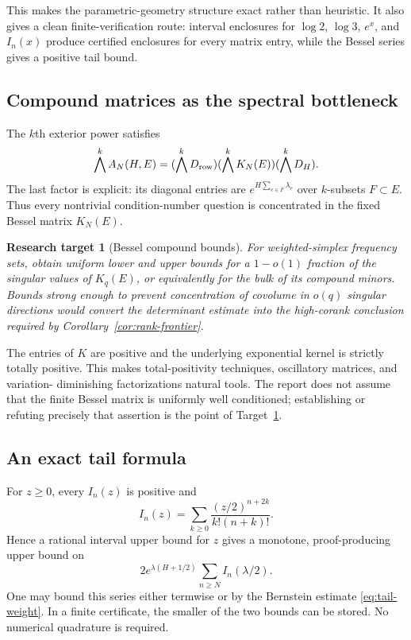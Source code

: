 \documentclass[11pt,oneside]{article}
\newtheorem{target}[theorem]{Research target}
\theoremstyle{definition}
\theoremstyle{remark}
\begin{document}
This makes the parametric-geometry structure exact rather than heuristic.  It also gives a
clean finite-verification route: interval enclosures for $\log2$, $\log3$, $e^x$, and
$I_n(x)$ produce certified enclosures for every matrix entry, while the Bessel series gives a
positive tail bound.

\subsection{Compound matrices as the spectral bottleneck}

The $k$th exterior power satisfies
\[
 \bigwedge^k A_N(H,E)=
 (\bigwedge^kD_{\rm row})(\bigwedge^kK_N(E))(\bigwedge^kD_H).
\]
The last factor is explicit: its diagonal entries are
$e^{H\sum_{e\in F}\lambda_e}$ over $k$-subsets $F\subset E$.  Thus every nontrivial
condition-number question is concentrated in the fixed Bessel matrix $K_N(E)$.

\begin{target}[Bessel compound bounds]
\label{target:bessel-compounds}
For weighted-simplex frequency sets, obtain uniform lower and upper bounds for a
$1-o(1)$ fraction of the singular values of $K_q(E)$, or equivalently for the bulk of its
compound minors.  Bounds strong enough to prevent concentration of covolume in $o(q)$ singular
directions would convert the determinant estimate into the high-corank conclusion required by
Corollary~\ref{cor:rank-frontier}.
\end{target}

The entries of $K$ are positive and the underlying exponential kernel is strictly totally
positive.  This makes total-positivity techniques, oscillatory matrices, and variation-
diminishing factorizations natural tools.  The report does not assume that the finite Bessel
matrix is uniformly well conditioned; establishing or refuting precisely that assertion is
the point of Target~\ref{target:bessel-compounds}.

\subsection{An exact tail formula}

For $z\ge0$, every $I_n(z)$ is positive and
\[
 I_n(z)=\sum_{k\ge0}\frac{(z/2)^{n+2k}}{k!(n+k)!}.
\]
Hence a rational interval upper bound for $z$ gives a monotone, proof-producing upper bound on
\[
 2e^{\lambda(H+1/2)}\sum_{n\ge N}I_n(\lambda/2).
\]
One may bound this series either termwise or by the Bernstein estimate
\eqref{eq:tail-weight}.  In a finite certificate, the smaller of the two bounds can be stored.
No numerical quadrature is required.
\end{document}
